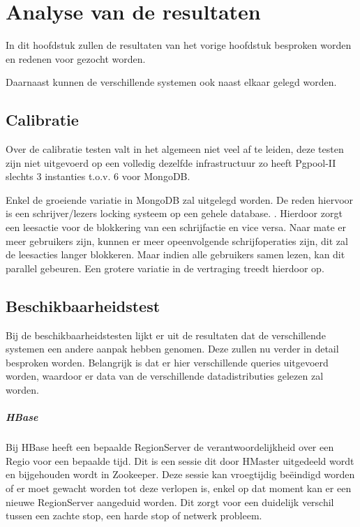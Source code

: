 \chapter{Analyse van de resultaten}
In dit hoofdstuk zullen de resultaten van het vorige hoofdstuk besproken worden en redenen voor gezocht worden. 

Daarnaast kunnen de verschillende systemen ook naast elkaar gelegd worden. 
\section{Calibratie}
Over de calibratie testen valt in het algemeen niet veel af te leiden, deze testen zijn niet uitgevoerd op een volledig dezelfde infrastructuur zo heeft Pgpool-II slechts 3 instanties t.o.v. 6 voor MongoDB. 

Enkel de groeiende variatie in MongoDB zal uitgelegd worden. De reden hiervoor is een schrijver/lezers locking systeem op een gehele database\cite{mongodb-concurrency}. . Hierdoor zorgt een leesactie voor de blokkering van een schrijfactie en vice versa. Naar mate er meer gebruikers zijn, kunnen er meer opeenvolgende schrijfoperaties zijn, dit zal de leesacties langer blokkeren. Maar indien alle gebruikers samen lezen, kan dit parallel gebeuren. Een grotere variatie in de vertraging treedt hierdoor op. 

\section{Beschikbaarheidstest}
Bij de beschikbaarheidstesten lijkt er uit de resultaten dat de verschillende systemen een andere aanpak hebben genomen. Deze zullen nu verder in detail besproken worden. Belangrijk  is dat er hier verschillende queries uitgevoerd worden, waardoor er data van de verschillende datadistributies gelezen zal worden. 

\paragraph{HBase} Bij HBase heeft een bepaalde RegionServer de verantwoordelijkheid over een Regio voor een bepaalde tijd. Dit is een sessie dit door HMaster uitgedeeld wordt en bijgehouden wordt in Zookeeper. Deze sessie kan vroegtijdig beëindigd worden of er moet gewacht worden tot deze verlopen is, enkel op dat moment kan er een nieuwe RegionServer aangeduid worden. Dit zorgt voor een duidelijk verschil tussen een zachte stop, een harde stop of netwerk probleem. 

